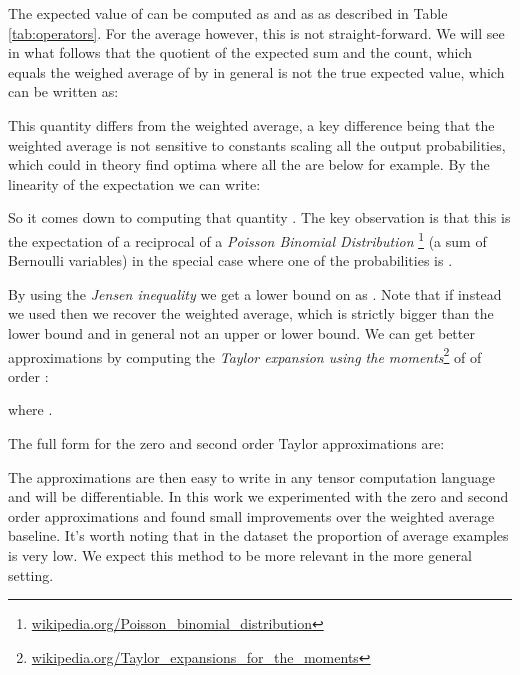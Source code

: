 \documentclass[11pt,a4paper]{article}
\begin{document}
The expected value of  can be computed as  and  as  as described in Table \ref{tab:operators}. For the average however, this is not straight-forward. We will see in what follows that the quotient of the expected sum and the count, which equals the weighed average of  by  in general is not the true expected value, which can be written as:



This quantity differs from the weighted average, a key difference being that the weighted average is not sensitive to constants scaling all the output probabilities, which could in theory find optima where all the  are below  for example. By the linearity of the expectation we can write:



So it comes down to computing that quantity . 
The key observation is that this is the expectation of a reciprocal of a \emph{Poisson Binomial Distribution} \footnote{\href{https://en.wikipedia.org/wiki/Poisson_binomial_distribution}{wikipedia.org/Poisson\_binomial\_distribution}} (a sum of Bernoulli variables) in the special case where one of the probabilities is .

By using the \emph{Jensen inequality} we get a lower bound on
 as . 
Note that if instead we used  then we recover the weighted average, which is strictly bigger than the lower bound and in general not an upper or lower bound. 
We can get better approximations by computing the \emph{Taylor expansion using the
moments}\footnote{\href{https://en.wikipedia.org/wiki/Taylor_expansions_for_the_moments_of_functions_of_random_variables}{wikipedia.org/Taylor\_expansions\_for\_the\_moments}} of  of order :


where .

The full form for the zero and second order Taylor approximations are:



The approximations are then easy to write in any tensor computation language and will be differentiable.
In this work we experimented with the zero and second order approximations and found small improvements over the weighted average baseline. It's worth noting that in the dataset the proportion of average examples is very low. We expect this method to be more relevant in the more general setting. 
\end{document}
